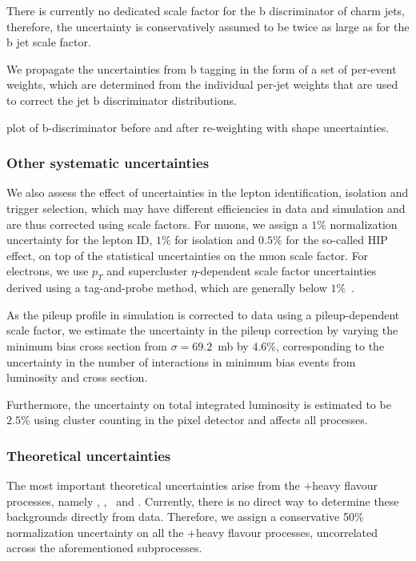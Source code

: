 There is currently no dedicated scale factor for the b discriminator of charm jets, therefore, the uncertainty is conservatively assumed to be twice as large as for the b jet scale factor.

We propagate the uncertainties from b tagging in the form of a set of per-event weights, which are determined from the individual per-jet weights that are used to correct the jet b discriminator distributions.

\fixme plot of b-discriminator before and after re-weighting with shape uncertainties.

\subsubsection{Other systematic uncertainties}
We also assess the effect of uncertainties in the lepton identification, isolation and trigger selection, which may have different efficiencies in data and simulation and are thus corrected using scale factors. For muons, we assign a $1\%$ normalization uncertainty for the lepton ID, $1\%$ for isolation and $0.5\%$ for the so-called HIP effect, on top of the statistical uncertainties on the muon scale factor\cite{CMS:2017_mu_sf}. For electrons, we use $p_T$ and supercluster $\eta$-dependent scale factor uncertainties derived using a tag-and-probe method, which are generally below $1\%$~\cite{CMS:2017_ele_sf}.

As the pileup profile in simulation is corrected to data using a pileup-dependent scale factor, we estimate the uncertainty in the pileup correction by varying the minimum bias cross section from $\sigma = 69.2$~mb by $4.6\%$, corresponding to the uncertainty in the number of interactions in minimum bias events from luminosity and cross section\cite{CMS:2017_pu_weight_twiki}.

Furthermore, the uncertainty on total integrated luminosity is estimated to be $2.5\%$ using cluster counting in the pixel detector and affects all processes\cite{CMS:2017sdi,CMS:2017_lumi}.

\subsubsection{Theoretical uncertainties}
The most important theoretical uncertainties arise from the \ttbar+heavy flavour processes, namely \ttbb, \tttwob, \ttb~and \ttcc. Currently, there is no direct way to determine these backgrounds directly from data. Therefore, we assign a conservative 50\% normalization uncertainty on all the \ttbar+heavy flavour processes, uncorrelated across the aforementioned subprocesses.

